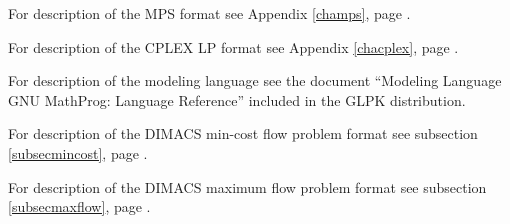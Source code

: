 \bigskip

\noindent
For description of the MPS format see Appendix \ref{champs},
page \pageref{champs}.

\bigskip

\noindent
For description of the CPLEX LP format see Appendix \ref{chacplex},
page \pageref{chacplex}.

\bigskip

\noindent
For description of the modeling language see the document ``Modeling
Language GNU MathProg: Language Reference'' included in the GLPK
distribution.

\bigskip

\noindent
For description of the DIMACS min-cost flow problem format see
subsection \ref{subsecmincost}, page \pageref{subsecmincost}.

\bigskip

\noindent
For description of the DIMACS maximum flow problem format see
subsection \ref{subsecmaxflow}, page \pageref{subsecmaxflow}.


